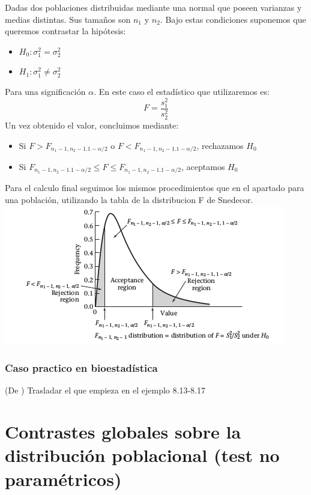 \documentclass[a4paper,12pt]{article}
\begin{document}
Dadas dos poblaciones distribuidas mediante una normal que poseen varianzas y medias distintas. Sus tamaños son  $n_1$ y $n_2$. Bajo estas condiciones suponemos que queremos contrastar la hipótesis:
\begin{itemize}
	\item $H_0:\sigma^2_1=\sigma^2_2$
	\item $H_1:\sigma^2_1\neq \sigma^2_2$
\end{itemize}
Para una significación $\alpha$.
En este caso el estadístico que utilizaremos es: 
$$F=\frac{s_1^2}{s_2^2}$$
Un vez obtenido el valor, concluimos mediante:
\begin{itemize}
	\item Si $F>F_{n_1-1,n_2-1.1-\alpha/2}$ o $F<F_{n_1-1,n_2-1.1-\alpha/2}$, rechazamos $H_0$
	\item Si $F_{n_1-1,n_2-1.1-\alpha/2}\leq F \leq F_{n_1-1,n_2-1.1-\alpha/2}$, aceptamos $H_0$
\end{itemize}
Para el calculo final seguimos los mismos procedimientos que en el apartado para una población, utilizando la tabla de la distribucion F de Snedecor.
\includegraphics{ejemplo_grafica.png}
 \subsubsection*{Caso practico en bioestadística}
 (De \cite{rosner2015fundamentals}) Trasladar el que empieza en el ejemplo 8.13-8.17 

\section{Contrastes globales sobre la distribución poblacional (test no paramétricos)}
\end{document}

